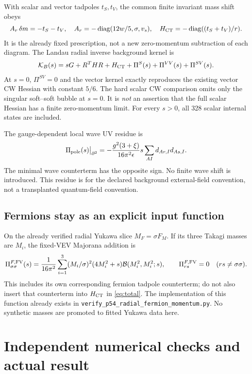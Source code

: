 \documentclass[11pt]{article}
\newcommand{\diag}{\operatorname{diag}}
\begin{document}
With scalar and vector tadpoles $t_S,t_V$, the common finite invariant
mass shift obeys
\begin{equation}
 A_r\,\delta m=-t_S-t_V,\quad
 A_r=-\diag(12w/5,\sigma,v_s),\quad
 H_{\rm CT}=-\diag((t_S+t_V)/r).
\end{equation}
It is the already fixed prescription, not a new zero-momentum
subtraction of each diagram. The Landau radial inverse background kernel is
\begin{equation}
 {\cal K}_B(s)=sG+R^THR+H_{\rm CT}
                      +\Pi^S(s)+\Pi^{VV}(s)+\Pi^{SV}(s).
 \label{eq:total}
\end{equation}
At $s=0$, $\Pi^{SV}=0$ and the vector kernel exactly reproduces the
existing vector CW Hessian with constant $5/6$. The hard scalar CW
comparison omits only the singular soft--soft bubble at $s=0$.
It is \emph{not} an assertion that the full scalar Hessian has a finite
zero-momentum limit. For every $s>0$, all 328 scalar internal states
are included.

The gauge-dependent local wave UV residue is
\begin{equation}
 \Pi_{\rm pole}(s)\big|_{\partial^2}
 =-\frac{g^2(3+\xi)}{16\pi^2\epsilon}
   s\sum_{AI}d_{Ar,I}d_{As,I}.
\end{equation}
The minimal wave counterterm has the opposite sign. No finite wave
shift is introduced. This residue is for the declared background
external-field convention, not a transplanted quantum-field convention.

\subsection{Fermions stay as an explicit input function}
On the already verified radial Yukawa slice $M_F=\sigma F_M$.
If its three Takagi masses are $M_i$, the fixed-VEV Majorana addition is
\begin{equation}
 \Pi^{F,\rm FV}_{\sigma\sigma}(s)
 =\frac1{16\pi^2}\sum_{i=1}^3
    (M_i/\sigma)^2(4M_i^2+s){\cal B}(M_i^2,M_i^2;s),
 \qquad \Pi^{F,\rm FV}_{rs}=0\quad (rs\ne\sigma\sigma).
\end{equation}
This includes its own corresponding fermion tadpole counterterm; do not
also insert that counterterm into $H_{\rm CT}$ in \eqref{eq:total}.
The implementation of this function already exists in
\texttt{verify\_p54\_radial\_fermion\_momentum.py}.
No synthetic masses are promoted to fitted Yukawa data here.

\section{Independent numerical checks and actual result}
\end{document}
